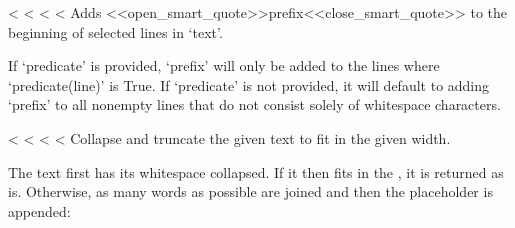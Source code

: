 \documentclass[letterpaper,10pt,english]{sphinxmanual}
\begin{document}
\begin{savenotes}
\begin{savenotes}
\begin{savenotes}
\begin{savenotes}

\begin{fulllineitems}
\label{\detokenize{index:textwrap.indent}}
<%
\pysigstartsignatures
<%
<%
<%
Adds <<open_smart_quote>>prefix<<close_smart_quote>> to the beginning of selected lines in ‘text’.

If ‘predicate’ is provided, ‘prefix’ will only be added to the lines
where ‘predicate(line)’ is True. If ‘predicate’ is not provided,
it will default to adding ‘prefix’ to all non\sphinxhyphen{}empty lines that do not
consist solely of whitespace characters.

\end{fulllineitems}


\begin{fulllineitems}
\label{\detokenize{index:textwrap.shorten}}
<%
\pysigstartsignatures
<%
<%
<%
Collapse and truncate the given text to fit in the given width.

The text first has its whitespace collapsed.  If it then fits in
the , it is returned as is.  Otherwise, as many words
as possible are joined and then the placeholder is appended:

\begin{sphinxVerbatim}[commandchars=\\\{\}]
 
 
\end{sphinxVerbatim}


\end{fulllineitems}
\end{savenotes}
\end{savenotes}
\end{savenotes}
\end{savenotes}
\end{document}
